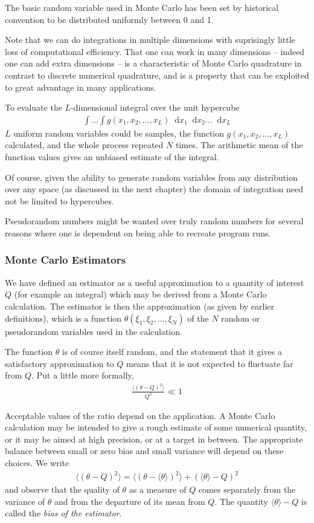 \documentclass[twoside,english]{uiofysmaster}
\newcommand*\dif{\mathop{}\!\mathrm{d}}
\begin{document}
The basic random variable used in Monte Carlo has been set by historical convention to be distributed uniformly between 0 and 1.

Note that we can do integrations in multiple dimensions with suprisingly little loss of computational efficiency. That one can work in many dimensions – indeed one can add extra dimensions – is a characteristic of Monte Carlo quadrature in contrast to discrete numerical quadrature, and is a property that can be exploited to great advantage in many applications.

To evaluate the $L$-dimensional integral over the unit hypercube 
\begin{align}
	\int ... \int g(x_1, x_2, ..., x_L) \dif x_1 \dif x_2 ... \dif x_L
\end{align}
$L$ uniform random variables could be samples, the function $g(x_1, x_2, ..., x_L)$ calculated, and the whole process repeated $N$ times. The arithmetic mean of the function values gives an unbiased estimate of the integral.

Of course, given the ability to generate random variables from any distribution over any space (as discussed in the next chapter) the domain of integration need not be limited to hypercubes.

Pseudorandom numbers might be wanted over truly random numbers for several reasons where one is dependent on being able to recreate program runs.

\subsubsection{Monte Carlo Estimators}
We have defined an estimator as a useful approximation to a quantity of interest $Q$ (for example an integral) which may be derived from a Monte Carlo calculation. The estimator is then the approximation (as given by earlier definitions), which is a function $\theta(\xi_1, \xi_2, ..., \xi_N)$ of the $N$ random or pseudorandom variables used in the calculation.

The function $\theta$ is of course itself random, and the statement that it gives a
satisfactory approximation to $Q$ means that it is not expected to fluctuate far from $Q$. Put a little more formally,
\begin{align}
	\frac{\langle (\theta - Q)^2 \rangle}{Q^2} \ll 1
\end{align}

Acceptable values of the ratio depend on the application. A Monte Carlo calculation may be intended to give a rough estimate of some numerical quantity, or it may be aimed at high precision, or at a target in between. The appropriate balance between small or zero bias and small variance will depend on these choices.
We write
\begin{align}
	\langle (\theta - Q)^2 \rangle = \langle (\theta -\langle \theta \rangle)^2 \rangle
	+ (\langle \theta \rangle - Q)^2
\end{align}
and observe that the quality of $\theta$ as a measure of $Q$ comes separately from the variance of $\theta$ and from the departure of its mean from $Q$. The quantity $\langle \theta \rangle - Q$ is called the \textit{bias of the estimator}. 
\end{document}
